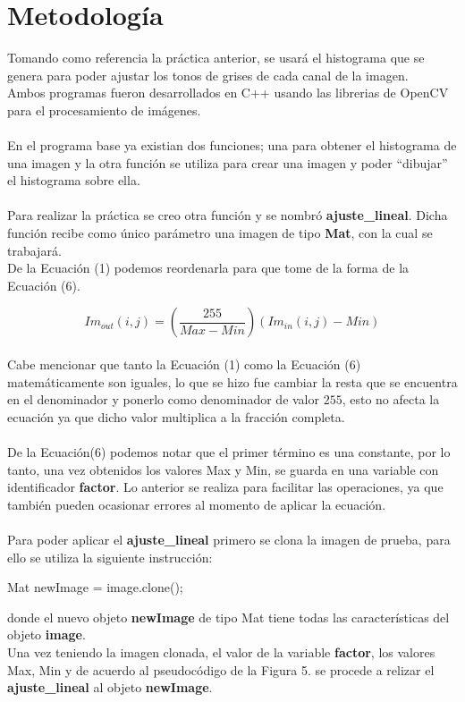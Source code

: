 \documentclass[conference]{IEEEtran}
\begin{document}
\section{Metodolog\'ia}
Tomando como referencia la pr\'actica anterior, se usar\'a el histograma que se genera para poder ajustar los tonos de grises de cada canal de la imagen.\\
Ambos programas fueron desarrollados en C++ usando las librerias de OpenCV para el procesamiento de im\'agenes.\\\\
En el programa base ya existian dos funciones; una para obtener el histograma de una imagen y la otra funci\'on se utiliza para crear una imagen y poder ``dibujar'' el histograma sobre ella.\\\\
Para realizar la pr\'actica se creo otra funci\'on y se nombr\'o \textbf{ajuste\_lineal}. Dicha funci\'on recibe como \'unico 
par\'ametro una imagen de tipo \textbf{Mat}, con la cual se trabajar\'a.\\

De la Ecuaci\'on (1) podemos reordenarla para que tome de la forma de la Ecuaci\'on (6).

\begin{equation}
	Im_{out}(i,j) = \left(\frac{255}{Max-Min}\right)\left(Im_{in}(i,j)-Min\right)
\end{equation}
\\
Cabe mencionar que tanto la Ecuaci\'on (1) como la Ecuaci\'on (6) matem\'aticamente son iguales, lo que se hizo fue cambiar la resta que se encuentra en el denominador y ponerlo como denominador de valor $255$, esto no afecta la ecuaci\'on ya que dicho valor multiplica a la fracci\'on completa.\\\\
De la Ecuaci\'on(6) podemos notar que el primer t\'ermino es una constante, por lo tanto, una vez obtenidos los valores Max y Min, se guarda en una variable con identificador \textbf{factor}. Lo anterior se realiza para facilitar las operaciones, ya que tambi\'en pueden ocasionar errores al momento de aplicar la ecuaci\'on.\\\\
Para poder aplicar el \textbf{ajuste\_lineal} primero se clona la imagen de prueba, para ello se utiliza la siguiente instrucci\'on:
\begin{center}
Mat newImage = image.clone();
\end{center}
donde el nuevo objeto \textbf{newImage} de tipo Mat tiene todas las caracter\'isticas del objeto \textbf{image}.\\
Una vez teniendo la imagen clonada, el valor de la variable \textbf{factor}, los valores Max, Min y de acuerdo al pseudoc\'odigo de la Figura 5. se procede a relizar el \textbf{ajuste\_lineal} al objeto \textbf{newImage}.
\end{document}
